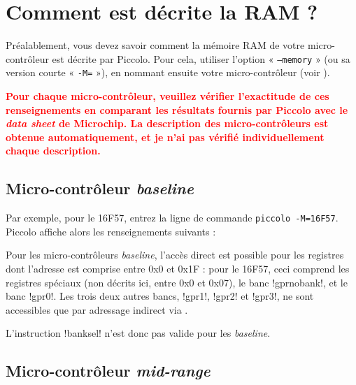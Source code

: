 


\thispagestyle{empty}








\section{Comment est décrite la RAM ?}

Préalablement, vous devez savoir comment la mémoire RAM de votre micro-contrôleur est décrite par Piccolo. Pour cela, utiliser l'option « \texttt{--memory} » (ou sa version courte « \texttt{-M=} »), en nommant ensuite votre micro-contrôleur (voir ).

\textcolor{red}{\bf Pour chaque micro-contrôleur, veuillez vérifier l'exactitude de ces renseignements en comparant les résultats fournis par Piccolo avec le \emph{data sheet} de Microchip. La description des micro-contrôleurs est obtenue automatiquement, et je n'ai pas vérifié individuellement chaque description.}



\subsection{Micro-contrôleur \emph{baseline}}

Par exemple, pour le 16F57, entrez la ligne de commande \texttt{piccolo -M=16F57}. Piccolo affiche alors les renseignements suivants :



Pour les micro-contrôleurs \emph{baseline}, l'accès direct est possible pour les registres dont l'adresse est comprise entre 0x0 et 0x1F : pour le 16F57, ceci comprend les registres spéciaux (non décrits ici, entre 0x0 et 0x07), le banc \pic!gprnobank!, et le banc \pic!gpr0!. Les trois deux autres bancs, \pic!gpr1!, \pic!gpr2! et \pic!gpr3!, ne sont accessibles que par adressage indirect via .

L'instruction \pic!banksel! n'est donc pas valide pour les \emph{baseline}.

\subsection{Micro-contrôleur \emph{mid-range}}

